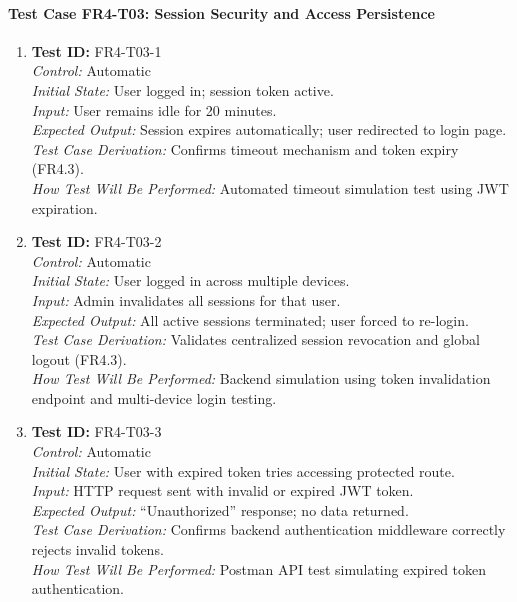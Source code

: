 \documentclass[12pt, titlepage]{article}
\begin{document}
\paragraph{Test Case FR4-T03: Session Security and Access Persistence}

\begin{enumerate}\setlength{\itemsep}{1em}
    \item \textbf{Test ID:} FR4-T03-1\\[0.5em]
    \textit{Control:} Automatic\\[0.3em]
    \textit{Initial State:} User logged in; session token active.\\[0.3em]
    \textit{Input:} User remains idle for 20 minutes.\\[0.3em]
    \textit{Expected Output:} Session expires automatically; user redirected to login page.\\[0.3em]
    \textit{Test Case Derivation:} Confirms timeout mechanism and token expiry (FR4.3).\\[0.3em]
    \textit{How Test Will Be Performed:} Automated timeout simulation test using JWT expiration.

    \item \textbf{Test ID:} FR4-T03-2\\[0.5em]
    \textit{Control:} Automatic\\[0.3em]
    \textit{Initial State:} User logged in across multiple devices.\\[0.3em]
    \textit{Input:} Admin invalidates all sessions for that user.\\[0.3em]
    \textit{Expected Output:} All active sessions terminated; user forced to re-login.\\[0.3em]
    \textit{Test Case Derivation:} Validates centralized session revocation and global logout (FR4.3).\\[0.3em]
    \textit{How Test Will Be Performed:} Backend simulation using token invalidation endpoint and multi-device login testing.

    \item \textbf{Test ID:} FR4-T03-3\\[0.5em]
    \textit{Control:} Automatic\\[0.3em]
    \textit{Initial State:} User with expired token tries accessing protected route.\\[0.3em]
    \textit{Input:} HTTP request sent with invalid or expired JWT token.\\[0.3em]
    \textit{Expected Output:} “Unauthorized” response; no data returned.\\[0.3em]
    \textit{Test Case Derivation:} Confirms backend authentication middleware correctly rejects invalid tokens.\\[0.3em]
    \textit{How Test Will Be Performed:} Postman API test simulating expired token authentication.
\end{enumerate}
\end{document}
